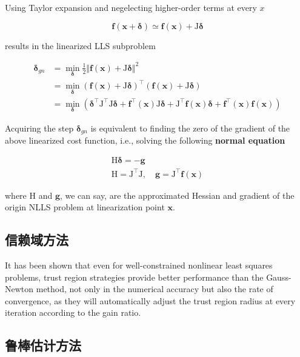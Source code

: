 Using Taylor expansion and negelecting higher-order terms at every $x$

\begin{equation}
    \mathbf{f}(\bm{x}+\bm{\delta}) \simeq \mathbf{f}(\bm{x}) + \mathrm{J}\bm{\delta}
\end{equation}

results in the linearized LLS subproblem

\begin{equation}
\begin{aligned}
    \bm{\delta}_{gn} &=
        \mathop{\min}_{\bm{\delta}}
        \frac{1}{2} \Vert \mathbf{f}(\bm{x}) + \mathrm{J}\bm{\delta} \Vert^2 \\ &=
        \mathop{\min}_{\bm{\delta}}
        \left( \mathbf{f}(\bm{x}) + \mathrm{J}\bm{\delta} \right)^\top
        \left( \mathbf{f}(\bm{x}) + \mathrm{J}\bm{\delta} \right) \\ &=
        \mathop{\min}_{\bm{\delta}}
        \left(
            \bm{\delta}^\top \mathrm{J}^\top \mathrm{J} \bm{\delta} +
            \mathbf{f}^\top(\bm{x}) \mathrm{J} \bm{\delta} +
            \mathrm{J}^\top \mathbf{f}(\bm{x}) \bm{\delta} +
            \mathbf{f}^\top(\bm{x}) \mathbf{f}(\bm{x})
        \right)
\end{aligned}
\end{equation}

Acquiring the step $\bm{\delta}_{gn}$ is equivalent to finding the zero of the gradient of the above linearized cost function, i.e., solving the following \textbf{normal equation}

\begin{equation}
\begin{gathered}
    \mathrm{H} \bm{\delta} = -\bm{g} \\
    \mathrm{H} = \mathrm{J}^\top \mathrm{J}, \quad
    \bm{g} = \mathrm{J}^\top \mathbf{f}(\bm{x})
\end{gathered}
\end{equation}

where $\mathrm{H}$ and $\bm{g}$, we can say, are the approximated Hessian and gradient of the origin NLLS problem at linearization point $\bm{x}$.

\subsection{信赖域方法}

It has been shown that even for well-constrained nonlinear least squares problems, trust region strategies provide better performance than the Gauss-Newton method, not only in the numerical accuracy but also the rate of convergence, as they will automatically adjust the trust region radius at every iteration according to the gain ratio.

\subsection{鲁棒估计方法}
